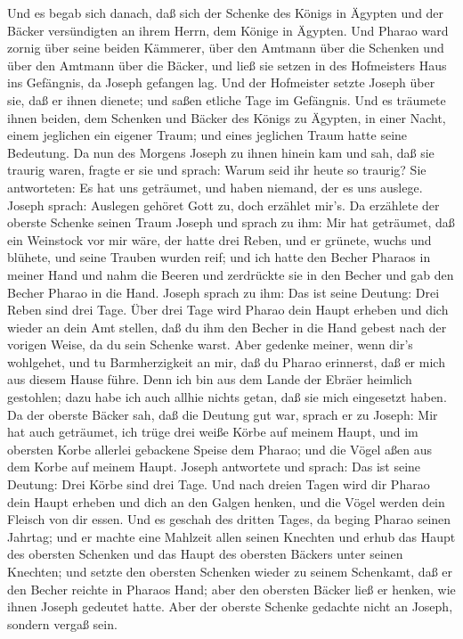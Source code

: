  Und es begab sich danach, daß sich der Schenke des Königs
in Ägypten und der Bäcker versündigten an ihrem Herrn, dem Könige in
Ägypten.  Und Pharao ward zornig über seine beiden Kämmerer,
über den Amtmann über die Schenken und über den Amtmann über die Bäcker,
 und ließ sie setzen in des Hofmeisters Haus ins Gefängnis,
da Joseph gefangen lag.  Und der Hofmeister setzte Joseph
über sie, daß er ihnen dienete; und saßen etliche Tage im Gefängnis.
 Und es träumete ihnen beiden, dem Schenken und Bäcker des
Königs zu Ägypten, in einer Nacht, einem jeglichen ein eigener Traum;
und eines jeglichen Traum hatte seine Bedeutung.  Da nun des
Morgens Joseph zu ihnen hinein kam und sah, daß sie traurig waren,
 fragte er sie und sprach: Warum seid ihr heute so traurig?
 Sie antworteten: Es hat uns geträumet, und haben niemand,
der es uns auslege. Joseph sprach: Auslegen gehöret Gott zu, doch
erzählet mir's.  Da erzählete der oberste Schenke seinen
Traum Joseph und sprach zu ihm: Mir hat geträumet, daß ein Weinstock vor
mir wäre,  der hatte drei Reben, und er grünete, wuchs und
blühete, und seine Trauben wurden reif;  und ich hatte den
Becher Pharaos in meiner Hand und nahm die Beeren und zerdrückte sie in
den Becher und gab den Becher Pharao in die Hand.  Joseph
sprach zu ihm: Das ist seine Deutung: Drei Reben sind drei Tage.
 Über drei Tage wird Pharao dein Haupt erheben und dich
wieder an dein Amt stellen, daß du ihm den Becher in die Hand gebest
nach der vorigen Weise, da du sein Schenke warst.  Aber
gedenke meiner, wenn dir's wohlgehet, und tu Barmherzigkeit an mir, daß
du Pharao erinnerst, daß er mich aus diesem Hause führe. 
Denn ich bin aus dem Lande der Ebräer heimlich gestohlen; dazu habe ich
auch allhie nichts getan, daß sie mich eingesetzt haben. 
Da der oberste Bäcker sah, daß die Deutung gut war, sprach er zu Joseph:
Mir hat auch geträumet, ich trüge drei weiße Körbe auf meinem Haupt,
 und im obersten Korbe allerlei gebackene Speise dem
Pharao; und die Vögel aßen aus dem Korbe auf meinem Haupt. 
Joseph antwortete und sprach: Das ist seine Deutung: Drei Körbe sind
drei Tage.  Und nach dreien Tagen wird dir Pharao dein
Haupt erheben und dich an den Galgen henken, und die Vögel werden dein
Fleisch von dir essen.  Und es geschah des dritten Tages,
da beging Pharao seinen Jahrtag; und er machte eine Mahlzeit allen
seinen Knechten und erhub das Haupt des obersten Schenken und das Haupt
des obersten Bäckers unter seinen Knechten;  und setzte den
obersten Schenken wieder zu seinem Schenkamt, daß er den Becher reichte
in Pharaos Hand;  aber den obersten Bäcker ließ er henken,
wie ihnen Joseph gedeutet hatte.  Aber der oberste Schenke
gedachte nicht an Joseph, sondern vergaß sein.

